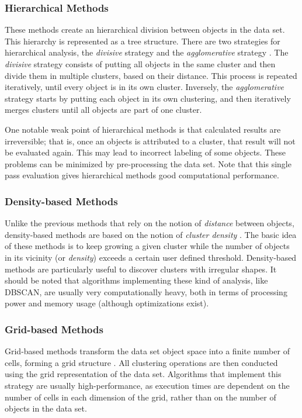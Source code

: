 \subsubsection*{Hierarchical Methods}

These methods create an hierarchical division between objects in the data set.
This hierarchy is represented as a tree structure. There are two strategies for
hierarchical analysis, the \emph{divisive} strategy and the \emph{agglomerative}
strategy \cite{han2006data}. The \emph{divisive} strategy consists of putting
all objects in the same cluster and then divide them in multiple clusters, based
on their distance. This process is repeated iteratively, until every object is
in its own cluster. Inversely, the \emph{agglomerative} strategy starts by
putting each object in its own clustering, and then iteratively merges clusters
until all objects are part of one cluster.

One notable weak point of hierarchical methods is that calculated results are
irreversible; that is, once an objects is attributed to a cluster, that result
will not be evaluated again. This may lead to incorrect labeling of some
objects. These problems can be minimized by pre-processing the data set. Note
that this single pass evaluation gives hierarchical methods good computational
performance.

\subsubsection*{Density-based Methods}

Unlike the previous methods that rely on the notion of \emph{distance} between
objects, density-based methods are based on the notion of \emph{cluster density}
\cite{han2006data}. The basic idea of these methods is to keep growing a given
cluster while the number of objects in its vicinity (or \emph{density}) exceeds
a certain user defined threshold. Density-based methods are particularly useful
to discover clusters with irregular shapes. It should be noted that algorithms
implementing these kind of analysis, like DBSCAN, are usually very
computationally heavy, both in terms of processing power and memory usage
(although optimizations exist).

\subsubsection*{Grid-based Methods}

Grid-based methods transform the data set object space into a finite number of
cells, forming a grid structure
\cite{han2006data,DBLP:journals/corr/abs-1205-1117}. All clustering operations
are then conducted using the grid representation of the data set. Algorithms
that implement this strategy are usually high-performance, as execution times
are dependent on the number of cells in each dimension of the grid, rather than
on the number of objects in the data set.

